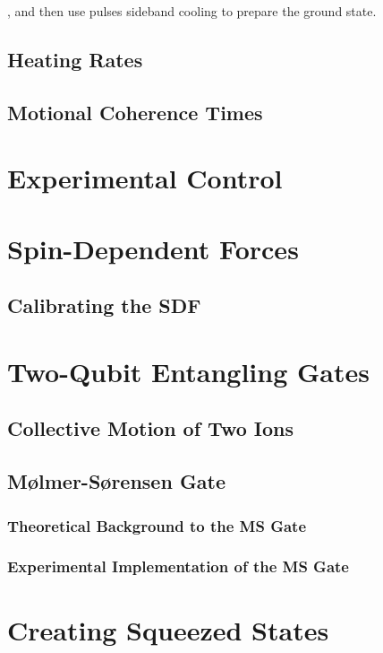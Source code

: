 \documentclass[12pt]{report}
\begin{document}
    , and then use pulses sideband cooling to prepare the ground
    state.


\subsection{Heating Rates}

\subsection{Motional Coherence Times}

\section{Experimental Control}
\label{sec:Experimental Control}

\section{Spin-Dependent Forces}
\label{sec:Spin-Dependent Forces}
\subsection{Calibrating the SDF}
\section{Two-Qubit Entangling Gates}
\label{sec:Two-Qubit Entangling Gates}
\subsection{Collective Motion of Two Ions}
\subsection{Mølmer-Sørensen Gate}
\subsubsection{Theoretical Background to the MS Gate}
\subsubsection{Experimental Implementation of the MS Gate}

\section{Creating Squeezed States}
\label{sec:Squeezed States}
\end{document}
